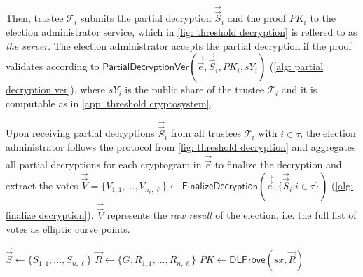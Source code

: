 Then, trustee $\mathcal{T}_i$ submits the partial decryption $\vec{\vec{S}}_i$ and the proof $PK_i$ to the election administrator service, which in \cref{fig: threshold decryption} is reffered to as \textit{the server}. The election administrator accepts the partial decryption if the proof validates according to $\mathsf{PartialDecryptionVer}(\vec{\vec{e}}, \vec{\vec{S}}_i, PK_i, sY_i)$ (\cref{alg: partial decryption ver}), where $sY_i$ is the public share of the trustee $\mathcal{T}_i$ and it is computable as in \cref{app: threshold cryptosystem}.

Upon receiving partial decryptions $\vec{\vec{S}}_i$ from all trustees $\mathcal{T}_i$ with $i \in \tau$, the election administrator follows the protocol from \cref{fig: threshold decryption} and aggregates all partial decryptions for each cryptogram in $\vec{\vec{e}}$ to finalize the decryption and extract the votes $\vec{\vec{V}} = \{ V_{1, 1}, ..., V_{n_\mathrm{e}, \ell} \} \gets \mathsf{FinalizeDecryption} (\vec{\vec{e}}, \{ \vec{\vec{S}}_i | i \in \tau \})$ (\cref{alg: finalize decryption}). $\vec{\vec{V}}$ represents the \textit{raw result} of the election, i.e. the full list of votes as elliptic curve points.

\begin{algorithm}[ht]
    \DontPrintSemicolon
    \caption{$\mathsf{PartiallyDecryptAndProve}(\vec{\vec{e}}, sx)$}
    \label{alg: partially decrypt and prove}
    
    $\vec{\vec{S}} \gets \{ S_{1, 1}, ..., S_{n, \ell} \}$ \;
    $\vec{R} \gets \{ G, R_{1, 1}, ..., R_{n, \ell} \}$ \;
    $PK \gets \mathsf{DLProve}(sx, \vec{R})$ 
     
\end{algorithm}

